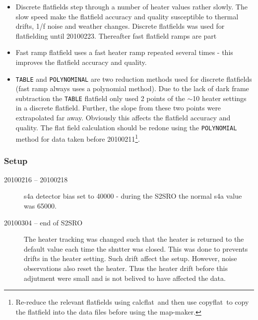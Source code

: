 \documentclass[twoside,11pt]{article}
\newcommand{\about}{$\sim$}
\newcommand{\xref}[3]{#1}
\renewcommand{\_}{\texttt{\symbol{95}}}
\newcommand{\task}[1]{\textsf{#1}}
\newcommand{\param}[1]{\texttt{#1}}
\newcommand{\copyflat}{\xref{\task{copyflat}}{sun258}{COPYFLAT}}
\newcommand{\calcflat}{\xref{\task{calcflat}}{sun258}{CALCFLAT}}
\begin{document}
\begin{itemize}
\item Discrete flatfields step through a number of heater values
  rather slowly. The slow speed make the flatfield accuracy and
  quality susceptible to thermal drifts, 1/f noise and weather
  changes. Discrete flatfields was used for flatfielding until
  20100223. Thereafter fast flatfield ramps are part

\item Fast ramp flatfield uses a fast heater ramp repeated several
  times - this improves the flatfield accuracy and quality.

\item \param{TABLE} and \param{POLYNOMINAL} are two reduction methods
  used for discrete flatfields (fast ramp always uses a polynomial
  method). Due to the lack of dark frame subtraction the \param{TABLE}
  flatfield only used 2 points of the \about10 heater settings in a
  discrete flatfield. Further, the slope from these two points were
  extrapolated far away.  Obviously this affects the flatfield
  accuracy and quality. The flat field calculation should be redone
  using the \param{POLYNOMIAL} method for data taken before
  20100211\footnote{Re-reduce the relevant flatfields using \calcflat\
    and then use \copyflat\ to copy the flatfield into the data files
    before using the map-maker.}.

\end{itemize}

\subsubsection{Setup}

\begin{description}

\item[20100216 -- 20100218] \mbox{}

  s4a detector bias set to 40000 - during the S2SRO the normal s4a value
  was 65000.

\item[20100304 -- end of S2SRO] \mbox{}

  The heater tracking was changed such that the heater is returned to
  the default value each time the shutter was closed. This was done to
  prevents drifts in the heater setting. Such drift affect the
  setup. However, noise observations also reset the heater. Thus the
  heater drift before this adjutment were small and is not belived to
  have affected the data.

\end{description}
\end{document}
